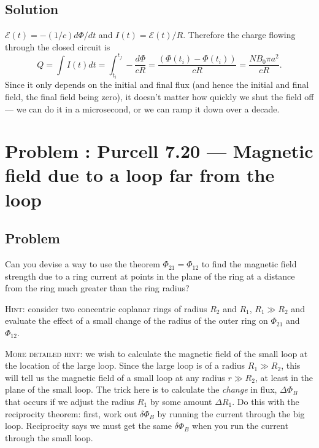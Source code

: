 \documentclass[solutions]{esg8022pset}
\begin{document}
\subsection{Solution}
  ${\mathcal{E}}(t) = -(1/c)d\Phi/dt$ and $I(t) =
  {\mathcal{E}}(t)/R$.  Therefore the charge flowing through the closed
  circuit is
  \begin{equation}
    Q=\int I(t)dt=\int_{t_{i}}^{t_{f}} -\frac{d\Phi}{cR}
    = \frac{(\Phi(t_{i}) - \Phi(t_{i}))
    }{cR}=\frac{NB_0\pi a^2}{cR}.
  \end{equation}
  Since it only depends on the initial and final flux (and hence the initial
  and final field, the final field being zero), it doesn't matter how quickly
  we shut the field off --- we can do it in a microsecond, or we can ramp it
  down over a decade.
\section{Problem \thesection: Purcell 7.20 --- Magnetic field due to a loop far from the loop}
\subsection{Problem}
  Can you devise a way to use the theorem $\Phi_{21}=\Phi_{12}$ to find the
  magnetic field strength due to a ring current at points in the plane of the
  ring at a distance from the ring much greater than the ring radius?

  \noindent \textsc{Hint}: consider two concentric coplanar rings of radius
  $R_{2}$ and $R_{1}$, $R_{1}\gg R_{2}$ and evaluate the effect of a small
  change of the radius of the outer ring on $\Phi_{21}$ and $\Phi_{12}$.

  \noindent \textsc{More detailed hint}:  we wish to calculate the magnetic
  field of the small loop at the location of the large loop.  Since the large
  loop is of a radius $R_1 \gg R_2$, this will tell us the magnetic field of a
  small loop at any radius $r \gg R_2$, at least in the plane of the small
  loop. The trick here is to calculate the {\it change} in flux, $\Delta\Phi_B$
  that occurs if we adjust the radius $R_1$ by some amount $\Delta R_1$.  Do
  this with the reciprocity theorem: first, work out $\delta\Phi_B$ by running
  the current through the big loop.  Reciprocity says we must get the same
  $\delta\Phi_B$ when you run the current through the small loop.
\end{document}
